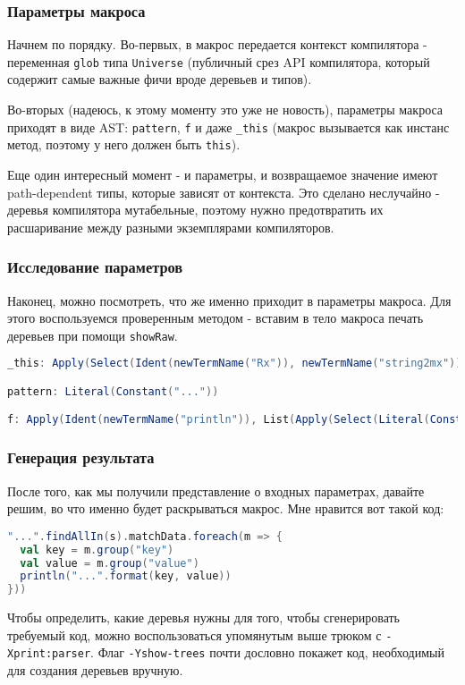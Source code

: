 \documentclass[hyperref={bookmarks=false}]{beamer}
\begin{document}
\begin{frame}[t,fragile]
\frametitle{Параметры макроса}

Начнем по порядку. Во-первых, в макрос передается контекст компилятора - переменная \texttt{glob} типа \texttt{Universe} (публичный срез API компилятора, который содержит самые важные фичи вроде деревьев и типов).

Во-вторых (надеюсь, к этому моменту это уже не новость), параметры макроса приходят в виде AST: \texttt{pattern}, \texttt{f} и даже \texttt{\_this} (макрос вызывается как инстанс метод, поэтому у него должен быть \texttt{this}).

Еще один интересный момент - и параметры, и возвращаемое значение имеют path-dependent типы, которые зависят от контекста. Это сделано неслучайно - деревья компилятора мутабельные, поэтому нужно предотвратить их расшаривание между разными экземплярами компиляторов.
\end{frame}

\begin{frame}[t,fragile]
\frametitle{Исследование параметров}

Наконец, можно посмотреть, что же именно приходит в параметры макроса. Для этого воспользуемся проверенным методом - вставим в тело макроса печать деревьев при помощи \texttt{showRaw}.

\begin{lstlisting}[language=scala]
_this: Apply(Select(Ident(newTermName("Rx")), newTermName("string2mx")), List(Select(This(newTypeName("Test")), newTermName("s"))))

pattern: Literal(Constant("..."))

f: Apply(Ident(newTermName("println")), List(Apply(Select(Literal(Constant("...")), newTermName("format")), List(Ident(newTermName("key")), Ident(newTermName("value"))))))
\end{lstlisting}
\end{frame}

\begin{frame}[t,fragile]
\frametitle{Генерация результата}

После того, как мы получили представление о входных параметрах, давайте решим, во что именно будет раскрываться макрос. Мне нравится вот такой код:

\begin{lstlisting}[language=scala]
"...".findAllIn(s).matchData.foreach(m => {
  val key = m.group("key")
  val value = m.group("value")
  println("...".format(key, value))
}))
\end{lstlisting}

Чтобы определить, какие деревья нужны для того, чтобы сгенерировать требуемый код, можно воспользоваться упомянутым выше трюком с \texttt{-Xprint:parser}. Флаг \texttt{-Yshow-trees} почти дословно покажет код, необходимый для создания деревьев вручную.
\end{frame}
\end{document}
